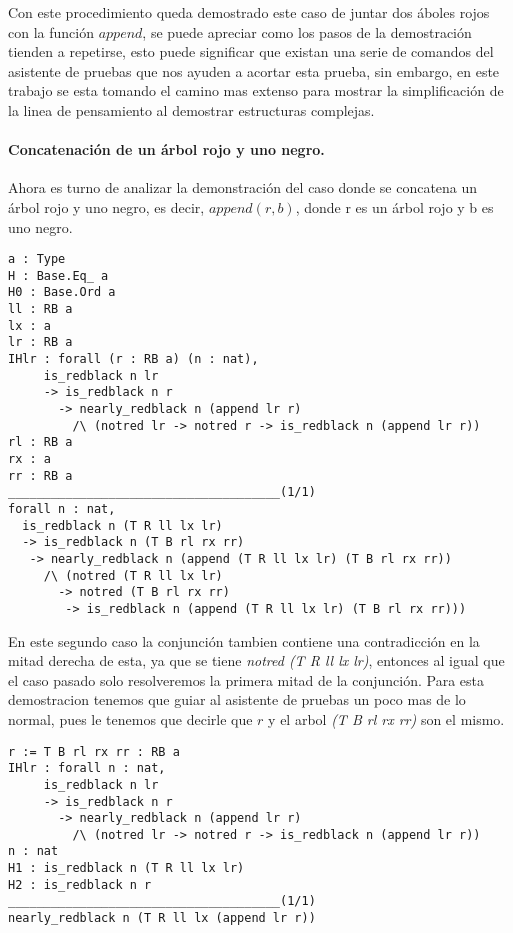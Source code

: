 Con este procedimiento queda demostrado este caso de juntar dos \'aboles rojos con la funci\'on
$append$, se puede apreciar como los pasos de la demostraci\'on tienden a repetirse, esto puede
significar que existan una serie de comandos del asistente de pruebas que nos ayuden a acortar
esta prueba, sin embargo, en este trabajo se esta tomando el camino mas extenso para mostrar la
simplificaci\'on de la linea de pensamiento al demostrar estructuras complejas.

\paragraph{Concatenaci\'on de un \'arbol rojo y uno negro.}

Ahora es turno de analizar la demonstraci\'on del caso donde se concatena un \'arbol rojo y uno negro, es decir, $append(r,b)$, donde r es un \'arbol rojo y b es uno negro.

\begin{verbatim}
a : Type
H : Base.Eq_ a
H0 : Base.Ord a
ll : RB a
lx : a
lr : RB a
IHlr : forall (r : RB a) (n : nat),
     is_redblack n lr
     -> is_redblack n r
       -> nearly_redblack n (append lr r)
         /\ (notred lr -> notred r -> is_redblack n (append lr r))
rl : RB a
rx : a
rr : RB a
______________________________________(1/1)
forall n : nat,
  is_redblack n (T R ll lx lr)
  -> is_redblack n (T B rl rx rr)
   -> nearly_redblack n (append (T R ll lx lr) (T B rl rx rr))
     /\ (notred (T R ll lx lr)
       -> notred (T B rl rx rr)
        -> is_redblack n (append (T R ll lx lr) (T B rl rx rr)))
\end{verbatim}

En este segundo caso la conjunci\'on tambien contiene una contradicci\'on en la mitad derecha de
esta, ya que se tiene \textit{notred (T R ll lx lr)}, entonces al igual que el caso pasado solo
resolveremos la primera mitad de la conjunci\'on. Para esta demostracion tenemos que guiar al asistente de pruebas un poco mas de lo normal, pues le tenemos que decirle que $r$ y el arbol \textit{(T B rl rx rr)} son el mismo.

\begin{verbatim}
r := T B rl rx rr : RB a
IHlr : forall n : nat,
     is_redblack n lr
     -> is_redblack n r
       -> nearly_redblack n (append lr r)
         /\ (notred lr -> notred r -> is_redblack n (append lr r))
n : nat
H1 : is_redblack n (T R ll lx lr)
H2 : is_redblack n r
______________________________________(1/1)
nearly_redblack n (T R ll lx (append lr r))
\end{verbatim}

